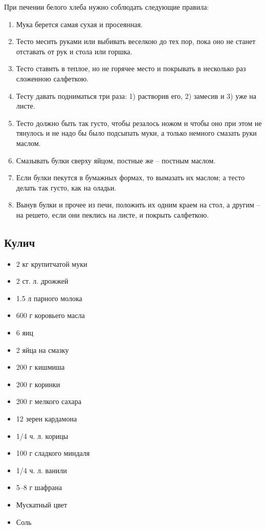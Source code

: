 При печении белого хлеба нужно соблюдать следующие правила:

\begin{enumerate}
	\item Мука берется самая сухая и просеянная.
	\item Тесто месить руками или выбивать веселкою до тех пор, пока оно не станет отставать от рук и стола или горшка.
	\item Тесто ставить в теплое, но не горячее место и покрывать в несколько раз сложенною салфеткою.
	\item Тесту давать подниматься три раза: 1) растворив его, 2) замесив и 3) уже на листе.
	\item Тесто должно быть так густо, чтобы резалось ножом и чтобы оно при этом не тянулось и не надо бы было подсыпать муки, а только немного смазать руки маслом.
	\item Смазывать булки сверху яйцом, постные же – постным маслом.
	\item Если булки пекутся в бумажных формах, то вымазать их маслом; а тесто делать так густо, как на оладьи.
	\item Вынув булки и прочее из печи, положить их одним краем на стол, а другим – на решето, если они пеклись на листе, и покрыть салфеткою.
\end{enumerate}

\subsection{Кулич}

\begin{itemize}
	\item 2 кг крупитчатой муки
    \item 2 ст. л. дрожжей 
    \item 1.5 л парного молока
    \item 600 г коровьего масла
    \item 6 яиц
    \item 2 яйца на смазку
    \item 200 г кишмиша 
    \item 200 г коринки 
    \item 200 г мелкого сахара
    \item 12 зерен кардамона
    \item 1/4 ч. л. корицы 
    \item 100 г сладкого миндаля 
    \item 1/4 ч. л. ванили 
    \item 5–8 г шафрана 
    \item Мускатный цвет
    \item Соль
\end{itemize}

